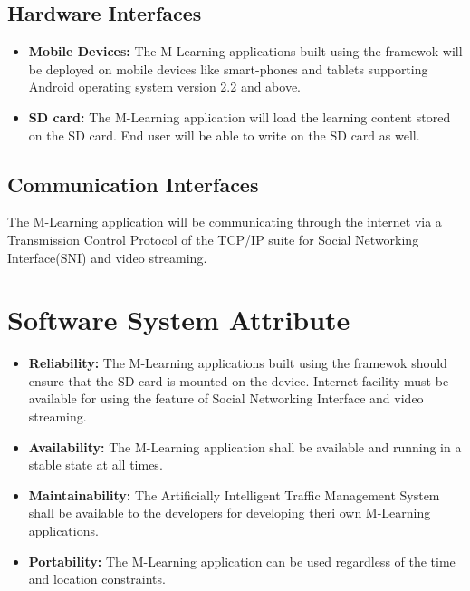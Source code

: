 \documentclass[openany,12pt]{report}
\begin{document}
\subsection{Hardware Interfaces}
\begin{itemize}
\item{\textbf{Mobile Devices:} The M-Learning applications built using the framewok will be deployed on mobile devices like smart-phones and tablets supporting Android operating system version 2.2 and above.}
\item{\textbf{SD card:}  The M-Learning application will load the learning content stored on the SD card. End user will be able to write on the SD card as well.}
\end{itemize}

\subsection{Communication Interfaces}
\hspace*{0.5in}The M-Learning application will be communicating through the internet via a Transmission Control Protocol of the TCP/IP suite for Social Networking Interface(SNI) and video streaming.

\section{Software System Attribute}
\begin{itemize}
\item{\textbf{Reliability:} The M-Learning applications built using the framewok should ensure that the SD card is mounted on the device. Internet facility must be available for using the feature of Social Networking Interface and video streaming.}
\item{\textbf{Availability:} The M-Learning application shall be available and running in a stable state at all times.}
\item{\textbf{Maintainability:}  The Artificially Intelligent Traffic Management System shall be available to the developers for developing theri own M-Learning applications.}
\item{\textbf{Portability:}  The M-Learning application can be used regardless of the time and location constraints.}

\end{itemize}
\end{document}

